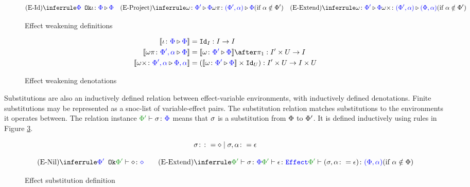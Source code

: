 \documentclass{Report}
\begin{document}
\begin{figure}[H]
    \centering
    \begin{framed}
        \[
    \ntreeruleI{\eid}{\ok{\P}}{\wrel{\i}{\P}{\P}}
    \quad
    \condtreeruleI{\eproject}{\wrel{\w}{\P'}{\P}}{\wrel{\w\pi}{(\P', \a)}{\P}}{\a\notin\P'}
    \quad
    \condtreeruleI{\eextend}{\wrel{\w}{\P'}{\P}}{\wrel{\w\x}{(\P', \a)}{(\P, \a)}}{\a\notin\P'}
\]
    \end{framed}
    \caption{Effect weakening definitions}
    \label{EffectWeakeningDefinition}
\end{figure}


\begin{figure}[H]
    \centering
    \begin{framed}
        \begin{align*}
            \deno{\wrel{\i}{\P}{\P}} & = \Id{I}: I \rightarrow I
            \\
            \deno{\wrel{\w\pi}{\P',\a}{\P}} & = \deno{\wrelw{\P'}{\P}}\after \p: I'\times U\rightarrow I
            \\
            \deno{\wrel{\w\x}{\P',\a}{\P,\a}} & = (\deno{\wrelw{\P'}{\P}}\times \Id{U}): I'\times U\rightarrow I\times U 
        \end{align*}
    \end{framed}
    \caption{Effect weakening denotations}
    \label{EffectWeakeningDenotations}
\end{figure}

Substitutions are also an inductively defined relation between effect-variable environments, with inductively defined denotations. Finite substitutions may be represented as a snoc-list of variable-effect pairs. The substitution relation matches substitutions to the environments it operates between. The relation instance $\typerelation{\P'}{\si}{\P}$ means that $\si$ is a substitution from $\P$ to $\P'$. It is defined inductively using rules in Figure \ref{EffectSubstitutionDefinition}.

\begin{figure}[H]
    \centering
    \begin{framed}
        \[
    \si \gens \nil \mid \si, \a \setto \e    
\]



\[
    \ntreeruleI{\esubnil}{\ok{\P'}}{\typerelation{\P'}{\nil}{\nil}}
    \quad\quad
    \condtreeruleII{\esubextend}{\typerelation{\P'}{\si}{\P}}{\wellformedeffect{\P'}{\e}}{\typerelation{\P'}{(\si, \a \setto\e)}{(\P, \a)}}{\a\notin\P}
\]
    \end{framed}
    
    \caption{Effect substitution definition}
    \label{EffectSubstitutionDefinition}
\end{figure}
\end{document}
